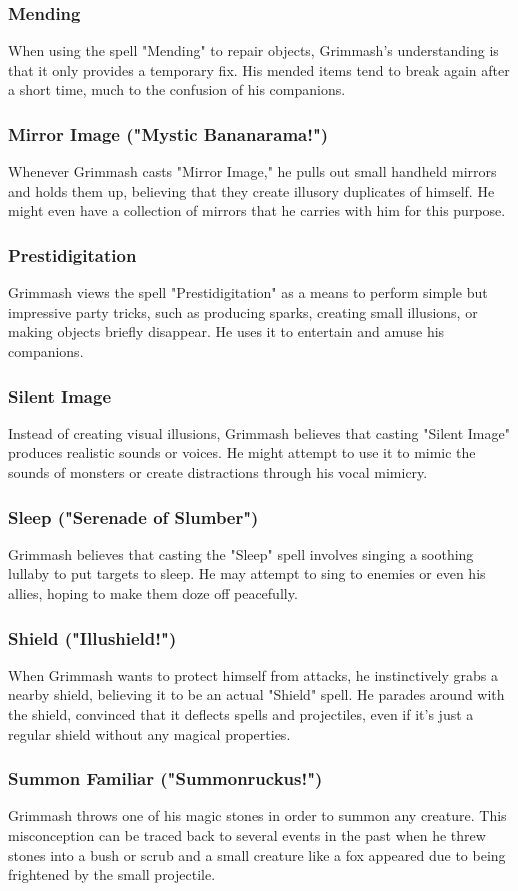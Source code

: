 \documentclass[letterpaper,openany,oneside,twocolumn]{book}
\newcommand{\PATH}{../../}
\begin{document}
\subsubsection*{Mending}
When using the spell "Mending" to repair objects, Grimmash's understanding is that it only provides a temporary fix. His mended items tend to break again after a short time, much to the confusion of his companions.
\subsubsection*{Mirror Image ("Mystic Bananarama!")}
Whenever Grimmash casts "Mirror Image," he pulls out small handheld mirrors and holds them up, believing that they create illusory duplicates of himself. He might even have a collection of mirrors that he carries with him for this purpose.
\subsubsection*{Prestidigitation}
Grimmash views the spell "Prestidigitation" as a means to perform simple but impressive party tricks, such as producing sparks, creating small illusions, or making objects briefly disappear. He uses it to entertain and amuse his companions.
\subsubsection*{Silent Image}
Instead of creating visual illusions, Grimmash believes that casting "Silent Image" produces realistic sounds or voices. He might attempt to use it to mimic the sounds of monsters or create distractions through his vocal mimicry.
\subsubsection*{Sleep ("Serenade of Slumber")}
Grimmash believes that casting the "Sleep" spell involves singing a soothing lullaby to put targets to sleep. He may attempt to sing to enemies or even his allies, hoping to make them doze off peacefully.
\subsubsection*{Shield ("Illushield!")}
When Grimmash wants to protect himself from attacks, he instinctively grabs a nearby shield, believing it to be an actual "Shield" spell. He parades around with the shield, convinced that it deflects spells and projectiles, even if it's just a regular shield without any magical properties.
\subsubsection*{Summon Familiar ("Summonruckus!")}
Grimmash throws one of his magic stones in order to summon any creature. This misconception can be traced back to several events in the past when he threw stones into a bush or scrub and a small creature like a fox appeared due to being frightened by the small projectile.


\end{document}
